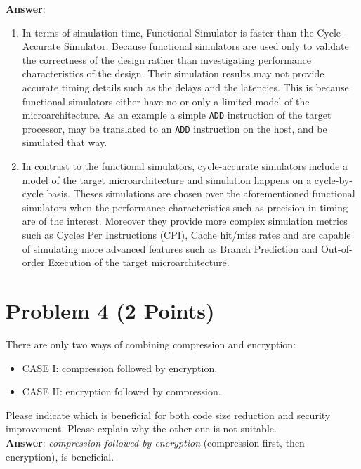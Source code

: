 \documentclass[11pt,letterpaper]{article}
\begin{document}
	\textbf{\Large Answer}:
	\begin{enumerate}
		\item In terms of simulation time, Functional Simulator is faster than the Cycle-Accurate Simulator. Because functional simulators  are used only to validate the correctness of the design rather than investigating performance characteristics of the design. Their simulation results may not provide accurate timing details such as the delays and the latencies. This is because functional simulators either have no or only a limited model of the microarchitecture. As an example a simple {\tt ADD} instruction of the target processor, may be translated to an {\tt ADD} instruction on the host, and be simulated that way.
		
		\item In contrast to the functional simulators, cycle-accurate simulators include a model of the target microarchitecture and simulation happens on a cycle-by-cycle basis. Theses  simulations are chosen over the aforementioned functional simulators when the performance characteristics such as precision in timing are of the interest. Moreover they provide more complex simulation metrics such as  Cycles Per Instructions (CPI), Cache hit/miss rates and are capable of simulating more advanced features such as Branch Prediction and Out-of-order Execution of the target microarchitecture.
		
	\end{enumerate}
	
	

	\section*{Problem 4 (2 Points)}
	
	There are only two ways of combining compression and encryption: 
	
	\begin{itemize}
		\item CASE I: compression followed by encryption.
		\item CASE II: encryption followed by compression.
	\end{itemize}
	
	Please  indicate  which  is beneficial for both  code  size  reduction  and  security  improvement.  Please explain why the other one is not suitable.\\
	
	\textbf{\Large Answer}: \textit{compression followed by encryption} (compression first, then encryption), is beneficial.\\
	
\end{document}
